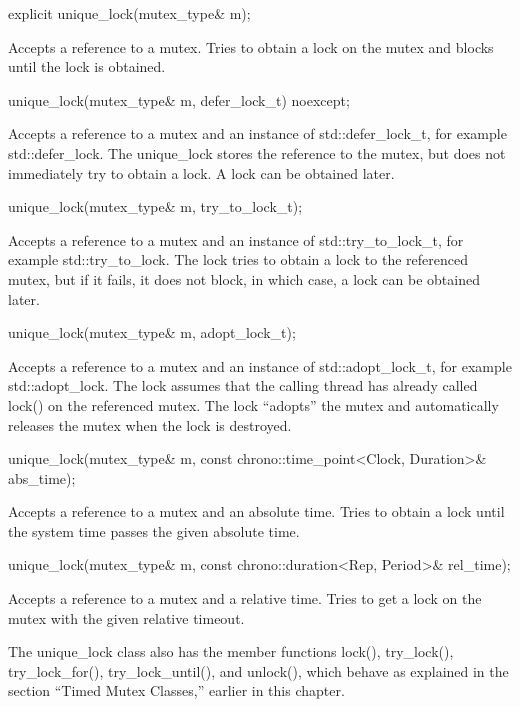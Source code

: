 \begin{cpp}
explicit unique_lock(mutex_type& m);
\end{cpp}

Accepts a reference to a mutex. Tries to obtain a lock on the mutex and blocks until the lock is obtained.

\begin{cpp}
unique_lock(mutex_type& m, defer_lock_t) noexcept;
\end{cpp}

Accepts a reference to a mutex and an instance of std::defer\_lock\_t, for example std::defer\_lock. The unique\_lock stores the reference to the mutex, but does not immediately try to obtain a lock. A lock can be obtained later.

\begin{cpp}
unique_lock(mutex_type& m, try_to_lock_t);
\end{cpp}

Accepts a reference to a mutex and an instance of std::try\_to\_lock\_t, for example std::try\_to\_lock. The lock tries to obtain a lock to the referenced mutex, but if it fails, it does not block, in which case, a lock can be obtained later.

\begin{cpp}
unique_lock(mutex_type& m, adopt_lock_t);
\end{cpp}

Accepts a reference to a mutex and an instance of std::adopt\_lock\_t, for example std::adopt\_lock. The lock assumes that the calling thread has already called lock() on the referenced mutex. The lock “adopts” the mutex and automatically releases the mutex when the lock is destroyed.

\begin{cpp}
unique_lock(mutex_type& m, const chrono::time_point<Clock, Duration>& abs_time);
\end{cpp}

Accepts a reference to a mutex and an absolute time. Tries to obtain a lock until the system time passes the given absolute time.

\begin{cpp}
unique_lock(mutex_type& m, const chrono::duration<Rep, Period>& rel_time);
\end{cpp}

Accepts a reference to a mutex and a relative time. Tries to get a lock on the mutex with the given relative timeout.

The unique\_lock class also has the member functions lock(), try\_lock(), try\_lock\_for(), try\_lock\_until(), and unlock(), which behave as explained in the section “Timed Mutex Classes,” earlier in this chapter.


